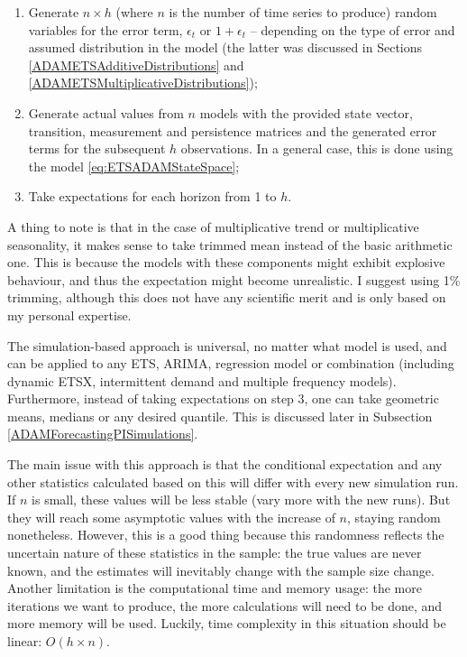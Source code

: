 \documentclass[
]{book}
\providecommand{\tightlist}{%
  \setlength{\itemsep}{0pt}\setlength{\parskip}{0pt}}
\theoremstyle{definition}
\theoremstyle{definition}
\theoremstyle{definition}
\theoremstyle{definition}
\theoremstyle{remark}
\begin{document}
\begin{enumerate}
\def\labelenumi{\arabic{enumi}.}
\tightlist
\item
  Generate \(n \times h\) (where \(n\) is the number of time series to produce) random variables for the error term, \(\epsilon_t\) or \(1+\epsilon_t\) -- depending on the type of error and assumed distribution in the model (the latter was discussed in Sections \ref{ADAMETSAdditiveDistributions} and \ref{ADAMETSMultiplicativeDistributions});
\item
  Generate actual values from \(n\) models with the provided state vector, transition, measurement and persistence matrices and the generated error terms for the subsequent \(h\) observations. In a general case, this is done using the model \eqref{eq:ETSADAMStateSpace};
\item
  Take expectations for each horizon from 1 to \(h\).
\end{enumerate}

A thing to note is that in the case of multiplicative trend or multiplicative seasonality, it makes sense to take trimmed mean instead of the basic arithmetic one. This is because the models with these components might exhibit explosive behaviour, and thus the expectation might become unrealistic. I suggest using 1\% trimming, although this does not have any scientific merit and is only based on my personal expertise.

The simulation-based approach is universal, no matter what model is used, and can be applied to any ETS, ARIMA, regression model or combination (including dynamic ETSX, intermittent demand and multiple frequency models). Furthermore, instead of taking expectations on step 3, one can take geometric means, medians or any desired quantile. This is discussed later in Subsection \ref{ADAMForecastingPISimulations}.

The main issue with this approach is that the conditional expectation and any other statistics calculated based on this will differ with every new simulation run. If \(n\) is small, these values will be less stable (vary more with the new runs). But they will reach some asymptotic values with the increase of \(n\), staying random nonetheless. However, this is a good thing because this randomness reflects the uncertain nature of these statistics in the sample: the true values are never known, and the estimates will inevitably change with the sample size change. Another limitation is the computational time and memory usage: the more iterations we want to produce, the more calculations will need to be done, and more memory will be used. Luckily, time complexity in this situation should be linear: \(O(h \times n)\).
\end{document}
